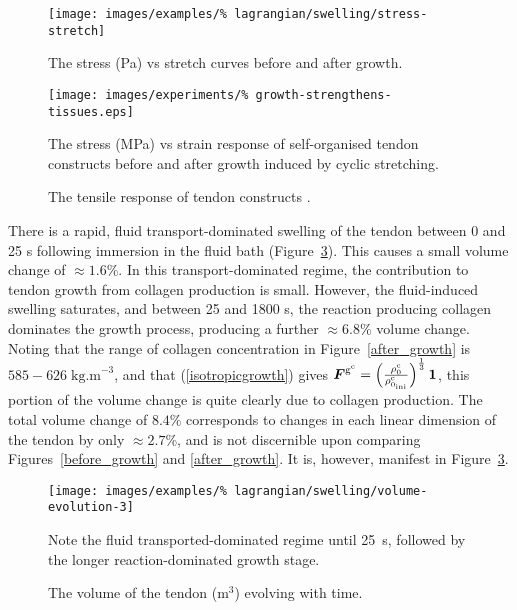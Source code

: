 \begin{figure}[!hpt]
  \centering
  \texttt{[image: images/examples/\%
    lagrangian/swelling/stress-stretch]}
  \caption{The stress (Pa) vs stretch curves before and after growth.}
  \label{stress_strain}
\end{figure}

\begin{figure}[!hpt]
  \begin{center}
    \texttt{[image: images/experiments/\%
      growth-strengthens-tissues.eps]}    
    \caption{The tensile response of tendon constructs
      \citep{arrudaetal05}.}
    \label{experiment-before-after-growth}
  \end{center}
      {The stress (MPa) vs strain response of self-organised tendon
        constructs before and after growth induced by cyclic
        stretching.}
\end{figure}

There is a rapid, fluid transport-dominated swelling of the tendon
between 0 and 25 s following immersion in the fluid bath
(Figure~\ref{volume_evolution}). This causes a small volume change of
$\approx 1.6$\%. In this transport-dominated regime, the contribution
to tendon growth from collagen production is small. However, the
fluid-induced swelling saturates, and between 25 and 1800 s, the
reaction producing collagen dominates the growth process, producing a
further $\approx 6.8$\% volume change. Noting that the range of
collagen concentration in Figure~\ref{after_growth} is $585-626\;
\mbox{kg.m}^{-3}$, and that (\ref{isotropicgrowth}) gives
$\mbox{\boldmath$ F$}^{\mathrm{g}^\mathrm{c}} = \left( \frac{\rho_0^\mathrm{c}}
{\rho_{0_{\mathrm{ini}}} ^\mathrm{c}} \right) ^ {\frac{1}{3}}
{\bf 1}$, this portion of the volume change is quite clearly due
to collagen production. The total volume change of $8.4$\%
corresponds to changes in each linear dimension of the tendon by
only $\approx 2.7$\%, and is not discernible upon comparing
Figures~\ref{before_growth} and \ref{after_growth}. It is,
however, manifest in Figure~\ref{volume_evolution}.

\begin{figure}[!hpt]
  \begin{center}
    \texttt{[image: images/examples/\%
      lagrangian/swelling/volume-evolution-3]}
    \caption{The volume of the tendon (m$^3$) evolving with time.}
    \label{volume_evolution}
  \end{center}
      {Note the fluid transported-dominated regime until 25~s,
        followed by the longer reaction-dominated growth stage.}
\end{figure}

%

